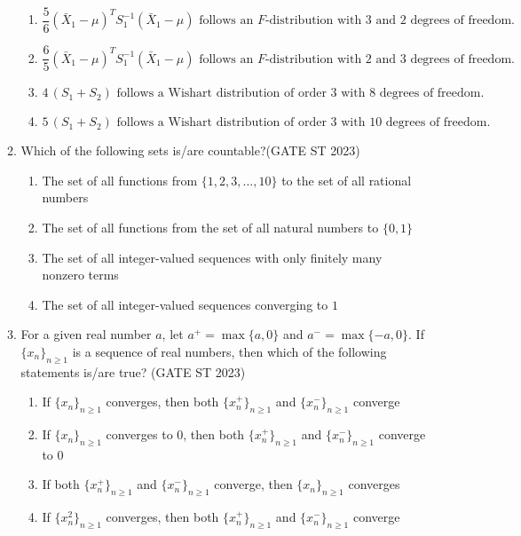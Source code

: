 \documentclass[journal]{IEEEtran}
\begin{document}
\begin{enumerate}[label=\textbf{Q.\arabic*.}, start=1, align=left, itemsep=2em]
\begin{enumerate}[label=\textbf{Q.\arabic*.}, start=11, align=left, itemsep=2em]
\begin{enumerate}[label=(\Alph*)]
    \item \[
    \frac{5}{6} (\bar{X}_1 - \mu)^{T} S_1^{-1} (\bar{X}_1 - \mu)
    \text{ follows an } F\text{-distribution with } 3 \text{ and } 2 \text{ degrees of freedom.}
    \]
    \item  \[
    \frac{6}{5} (\bar{X}_1 - \mu)^{T} S_1^{-1} (\bar{X}_1 - \mu)
    \text{ follows an } F\text{-distribution with } 2 \text{ and } 3 \text{ degrees of freedom.}
    \]
    \item  \[
    4\,(S_1 + S_2) \text{ follows a Wishart distribution of order } 3 \text{ with } 8 \text{ degrees of freedom.}
    \]
    \item\[
    5\,(S_1 + S_2) \text{ follows a Wishart distribution of order } 3 \text{ with } 10 \text{ degrees of freedom.}
    \]
\end{enumerate}

\item Which of the following sets is/are countable?\hfill(GATE ST 2023)
\begin{enumerate}[label=(\Alph*)]
\item The set of all functions from $\{1,2,3,\dots,10\}$ to the set of all rational numbers
\item The set of all functions from the set of all natural numbers to $\{0,1\}$
\item The set of all integer-valued sequences with only finitely many nonzero terms
\item The set of all integer-valued sequences converging to $1$
\end{enumerate}

\item For a given real number $a$, let $a^{+} = \max\{a, 0\}$ and $a^{-} = \max\{-a, 0\}$.  
If $\{x_n\}_{n \ge 1}$ is a sequence of real numbers, then which of the following statements is/are true? \hfill(GATE ST 2023) 

\begin{enumerate}[label=(\Alph*)]
    \item If $\{x_n\}_{n \ge 1}$ converges, then both $\{x_n^{+}\}_{n \ge 1}$ and $\{x_n^{-}\}_{n \ge 1}$ converge
    \item If $\{x_n\}_{n \ge 1}$ converges to $0$, then both $\{x_n^{+}\}_{n \ge 1}$ and $\{x_n^{-}\}_{n \ge 1}$ converge to $0$
    \item If both $\{x_n^{+}\}_{n \ge 1}$ and $\{x_n^{-}\}_{n \ge 1}$ converge, then $\{x_n\}_{n \ge 1}$ converges
    \item If $\{x_n^2\}_{n \ge 1}$ converges, then both $\{x_n^{+}\}_{n \ge 1}$ and $\{x_n^{-}\}_{n \ge 1}$ converge
\end{enumerate}


\end{enumerate}
\end{enumerate}
\end{document}
